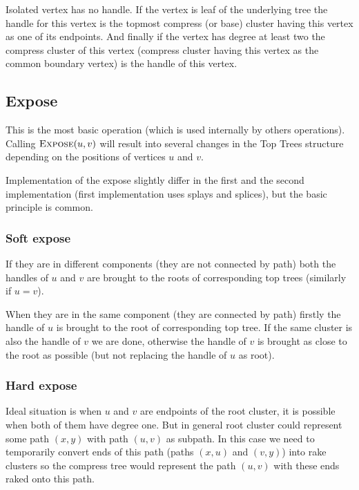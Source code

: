Isolated vertex has no handle. If the vertex is leaf of the underlying tree the
handle for this vertex is the topmost compress (or base) cluster having this
vertex as one of its endpoints. And finally if the vertex has degree at least
two the compress cluster of this vertex (compress cluster having this vertex
as the common boundary vertex) is the handle of this vertex.

\subsection{Expose}

This is the most basic operation (which is used internally by others
operations). Calling $\hbox{\sc Expose}(u,v)$ will result into several changes in the Top
Trees structure depending on the positions of vertices $u$ and $v$.

Implementation of the expose slightly differ in the first and the second
implementation (first implementation uses splays and splices), but the basic
principle is common.

\subsubsection{Soft expose}

If they are in different components (they are not connected by path) both the
handles of $u$ and $v$ are brought to the roots of corresponding top trees
(similarly if $u=v$).

When they are in the same component (they are connected by path) firstly the
handle of $u$ is brought to the root of corresponding top tree. If the same
cluster is also the handle of $v$ we are done, otherwise the handle of $v$ is
brought as close to the root as possible (but not replacing the handle of $u$ as
root).

\subsubsection{Hard expose}

Ideal situation is when $u$ and $v$ are endpoints of the root cluster, it is
possible when both of them have degree one. But in general root cluster could
represent some path $(x,y)$ with path $(u,v)$ as subpath. In this case we need
to temporarily convert ends of this path (paths $(x,u)$ and $(v,y)$) into rake
clusters so the compress tree would represent the path $(u,v)$ with these ends
raked onto this path.


